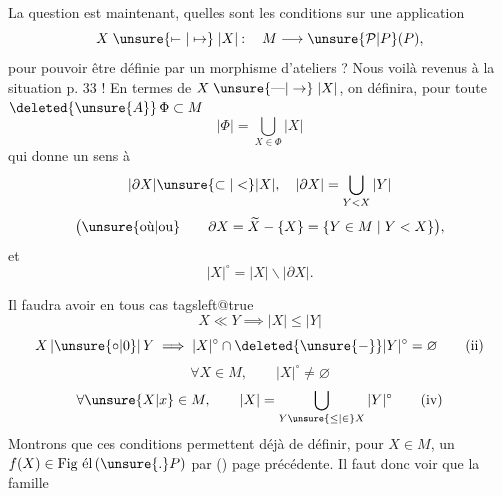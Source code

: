 
La question est maintenant, quelles sont les conditions sur une application 
\[
 X\mathrel{\unsure{\mapstochar\relbar|\mapsto}}|X|\mathbin{:}\quad M\longrightarrow\unsure{\mathcal P|P}(P),
\]
pour  pouvoir être définie par un morphisme d'ateliers ? Nous voilà revenus à la situation p. 33 ! En termes de $X\mathrel{\unsure{\text{---}|\to}}|X|$, on définira, pour  toute   $\deleted{\unsure{A}}\,\Phi\subset M$
\[
 |\Phi|=\bigcup_{X\in\Phi}|X|
\]
 qui donne un sens à
\[
 |\partial X|\unsure{\subset|<}|X|,\quad |\partial X|=\bigcup_{Y<X}|Y|
\]
\[
 \bigl(\text{\unsure{où|ou}}\qquad\partial X=\widetilde X-\{X\}=\{Y\in M\mid Y<X\}\bigr),
\]
et 
\[
 |X|^\circ=|X|\mathbin{\backslash}|\partial X|.
\]

 Il faudra avoir en tous cas
\begingroup\csname tagsleft@true\endcsname
\[
 X\ll Y\implies |X|\leq |Y| \tag*{(i)}
\]
\[
 X\,|\unsure{\circ|0}|\,Y\implies |X|^\circ\cap\deleted{\unsure{-}}|Y|^\circ=\varnothing \tag*{(ii)}
\]
\[
 \forall X\in M,\qquad |X|^\circ\ne\varnothing \tag*{(iii)}
\]
\[
 \forall \unsure{X|x}\in M,\qquad |X|=\bigcup_{Y\unsure{\leq|\in} X}|Y|^\circ \tag*{(iv)}
\]
\endgroup
Montrons que ces conditions permettent déjà de définir, pour  $X\in M$, un $f(X)\in\text{Fig él}\,(\unsure{.}P)$ par () page précédente. Il faut donc voir que la famille

